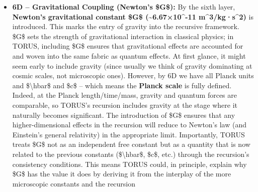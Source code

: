 \documentclass[
]{article}
\begin{document}
\begin{itemize}
{  action}\hspace{0pt}. This constant dictates that action (energy ×
  time, or momentum × length) comes in discrete quanta; its introduction
  means that by 5D the recursion framework naturally includes the
  Heisenberg uncertainty principle and wave-particle duality. In other
  words, the basic rule of quantum physics -- that phenomena occur in
  discrete ``chunks'' governed by \$\textbackslash hbar\$ -- is now
  built into TORUS. All the familiar quantum laws (Schrödinger's
  equation, etc.) can in principle emerge at this stage or beyond, since
  the theory now contains \$c\$ and \$\textbackslash hbar\$ along with
  the Planck units. Notably, TORUS doesn't modify the proven structure
  of quantum mechanics; rather, it \textbf{ensures quantum mechanics is
  a mandatory outcome} at the appropriate scale of the recursion. The
  appearance of \$\textbackslash hbar\$ here links back to the earlier
  constants so that quantum behavior meshes consistently with the
  space-time structure already in place.
\item
  \textbf{6D -- Gravitational Coupling (Newton's \$G\$):} By the sixth
  layer, \textbf{Newton's gravitational constant \$G\$
  (\textasciitilde6.67×10\^{}-11 m\^{}3/kg·s\^{}2)} is introduced. This
  marks the entry of gravity into the recursive framework. \$G\$ sets
  the strength of gravitational interaction in classical physics; in
  TORUS, including \$G\$ ensures that gravitational effects are
  accounted for and woven into the same fabric as quantum effects. At
  first glance, it might seem early to include gravity (since usually we
  think of gravity dominating at cosmic scales, not microscopic ones).
  However, by 6D we have all Planck units and \$\textbackslash hbar\$
  and \$c\$ -- which means the \textbf{Planck scale} is fully defined.
  Indeed, at the Planck length/time/mass, gravity and quantum forces are
  comparable, so TORUS's recursion includes gravity at the stage where
  it naturally becomes significant. The introduction of \$G\$ ensures
  that any higher-dimensional effects in the recursion will reduce to
  Newton's law (and Einstein's general relativity) in the appropriate
  limit. Importantly, TORUS treats \$G\$ not as an independent free
  constant but as a quantity that is now related to the previous
  constants (\$\textbackslash hbar\$, \$c\$, etc.) through the
  recursion's consistency conditions. This means TORUS could, in
  principle, explain why \$G\$ has the value it does by deriving it from
  the interplay of the more microscopic constants and the recursion

\end{itemize}
\end{document}
